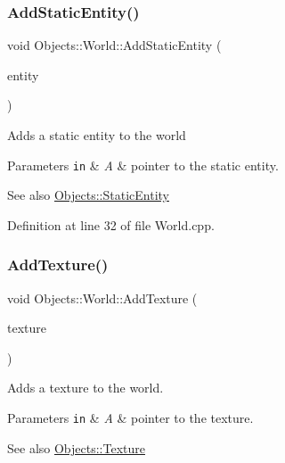 \subsubsection{\texorpdfstring{Add\+Static\+Entity()}{AddStaticEntity()}}
{\footnotesize\ttfamily void Objects\+::\+World\+::\+Add\+Static\+Entity (\begin{DoxyParamCaption}\item[{std\+::shared\+\_\+ptr$<$ \hyperlink{class_objects_1_1_static_entity}{Static\+Entity} $>$}]{entity }\end{DoxyParamCaption})}

Adds a static entity to the world 
\begin{DoxyParams}[1]{Parameters}
\mbox{\tt in}  & {\em A} & pointer to the static entity. \\
\hline
\end{DoxyParams}
\begin{DoxySeeAlso}{See also}
\hyperlink{class_objects_1_1_static_entity}{Objects\+::\+Static\+Entity} 
\end{DoxySeeAlso}


Definition at line 32 of file World.\+cpp.

\mbox{\label{class_objects_1_1_world_af564fbdf334909ccc2e625be04d05b65}} 
\subsubsection{\texorpdfstring{Add\+Texture()}{AddTexture()}}
{\footnotesize\ttfamily void Objects\+::\+World\+::\+Add\+Texture (\begin{DoxyParamCaption}\item[{std\+::shared\+\_\+ptr$<$ \hyperlink{class_objects_1_1_texture}{Texture} $>$}]{texture }\end{DoxyParamCaption})}

Adds a texture to the world. 
\begin{DoxyParams}[1]{Parameters}
\mbox{\tt in}  & {\em A} & pointer to the texture. \\
\hline
\end{DoxyParams}
\begin{DoxySeeAlso}{See also}
\hyperlink{class_objects_1_1_texture}{Objects\+::\+Texture} 
\end{DoxySeeAlso}


